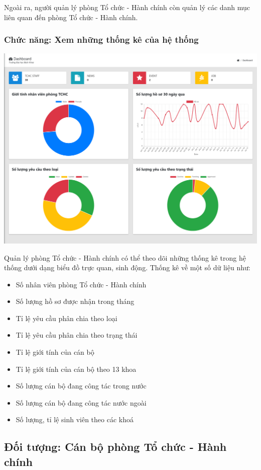 Ngoài ra, người quản lý phòng Tổ chức - Hành chính còn quản lý các danh mục liên quan đến phòng Tổ chức - Hành chính.
\subsubsection{Chức năng: Xem những thống kê của hệ thống}
\begin{center}
  \captionsetup{type=figure}
  \includegraphics[width=15cm]{img/UML/User/dashboard.png}
\end{center}

Quản lý phòng Tổ chức - Hành chính có thể theo dõi những thống kê trong hệ thống dưới dạng biểu đồ trực quan, sinh động. Thống kê về một số dữ liệu như:
\begin{itemize}
    \item Số nhân viên phòng Tổ chức - Hành chính
    \item Số lượng hồ sơ được nhận trong tháng
    \item Tỉ lệ yêu cầu phân chia theo loại
    \item Tỉ lệ yêu cầu phân chia theo trạng thái
    \item Tỉ lệ giới tính của cán bộ
    \item Tỉ lệ giới tính của cán bộ theo 13 khoa
    \item Số lượng cán bộ đang công tác trong nước
    \item Số lượng cán bộ đang công tác nước ngoài
    \item Số lượng, tỉ lệ sinh viên theo các khoá
\end{itemize}
\subsection{Đối tượng: Cán bộ phòng Tổ chức - Hành chính}
